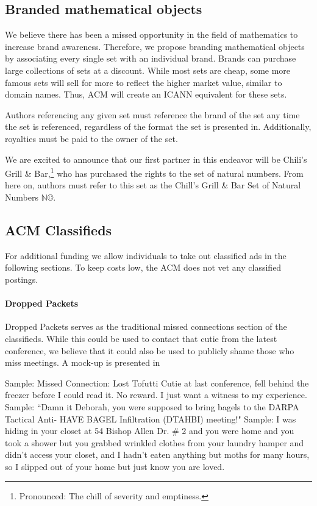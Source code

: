 \subsection{Branded mathematical objects}
We believe there has been a missed opportunity in the field of mathematics to
increase brand awareness.
Therefore, we propose branding mathematical objects by associating every single
set with an individual brand.
Brands can purchase large collections of sets at a discount.
While most sets are cheap, some more famous sets will sell for more to reflect
the higher market value, similar to domain names.
Thus, ACM will create an ICANN equivalent for these sets.

Authors referencing any given set must reference the brand of the set any time
the set is referenced, regardless of the format the set is presented  in.
Additionally, royalties must be paid to the owner of the set.

We are excited to announce that our first partner in this endeavor will be
Chili's Grill \& Bar,\footnote{Pronounced:  The chill of severity and emptiness.} who has purchased the rights to the set of natural
numbers.
From here on, authors must refer to this set as the Chill's Grill \& Bar Set of
Natural Numbers \(\mathbb{N}\)\copyright.

\subsection{ACM Classifieds}
For additional funding we allow individuals to take out classified ads in the
following sections.
To keep costs low, the ACM does not vet any classified postings.

\paragraph{Dropped Packets}
Dropped Packets serves as the traditional missed connections section of the
classifieds. While this could be used to contact that cutie from the latest
conference, we believe that it could also be used to publicly shame those who miss meetings. A mock-up is presented in 

Sample: Missed Connection: Lost Tofutti Cutie at last conference, fell behind the freezer before I could read it. No reward. I just want a witness to my experience.
Sample: ``Damn it Deborah, you were supposed to bring bagels to the DARPA
Tactical Anti- HAVE BAGEL Infiltration 
(DTAHBI) meeting!"
Sample: I was hiding in your closet at 54 Bishop Allen Dr. # 2 and you were home and you took a shower but you grabbed wrinkled clothes from your laundry hamper and didn't access your closet, and I hadn't eaten anything but moths for many hours, so I slipped out of your home but just know you are loved.

